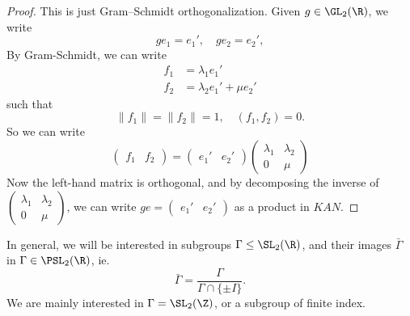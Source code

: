 \documentclass[a4paper]{article}
\begin{document}
\begin{proof}
  This is just Gram--Schmidt orthogonalization. Given $g \in \GL_2(\R)$, we write
  \[
    g e_1 = e_1',\quad g e_2 = e_2',
  \]
  By Gram-Schmidt, we can write
  \begin{align*}
    f_1 &= \lambda_1 e_1'\\
    f_2 &= \lambda_2 e_1' + \mu e_2'
  \end{align*}
  such that
  \[
    \|f_1\| = \|f_2\| = 1,\quad (f_1, f_2) = 0.
  \]
  So we can write
  \[
    \begin{pmatrix}
      f_1 & f_2
    \end{pmatrix} = 
    \begin{pmatrix}
      e_1' & e_2'
    \end{pmatrix}
    \begin{pmatrix}
      \lambda_1 & \lambda_2\\
      0 & \mu
    \end{pmatrix}
  \]
  Now the left-hand matrix is orthogonal, and by decomposing the inverse of $\begin{pmatrix} \lambda_1 & \lambda_2\\0 & \mu\end{pmatrix}$, we can write $ge = \begin{pmatrix}e_1' & e_2'\end{pmatrix}$ as a product in $KAN$.
\end{proof}
In general, we will be interested in subgroups $\Gamma \leq\SL_2(\R)$, and their images $\bar\Gamma$ in $\Gamma \in \PSL_2(\R)$, ie.
\[
  \bar\Gamma = \frac{\Gamma}{\Gamma \cap \{\pm I\}}.
\]
We are mainly interested in $\Gamma = \SL_2(\Z)$, or a subgroup of finite index.
\end{document}

